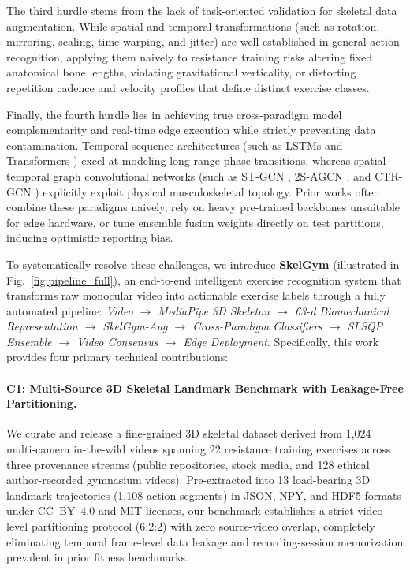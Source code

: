 \documentclass[runningheads]{llncs}
\begin{document}
The third hurdle stems from the lack of task-oriented validation for skeletal data augmentation. While spatial and temporal transformations (such as rotation, mirroring, scaling, time warping, and jitter) are well-established in general action recognition, applying them naively to resistance training risks altering fixed anatomical bone lengths, violating gravitational verticality, or distorting repetition cadence and velocity profiles that define distinct exercise classes.

Finally, the fourth hurdle lies in achieving true cross-paradigm model complementarity and real-time edge execution while strictly preventing data contamination. Temporal sequence architectures (such as LSTMs \cite{hochreiter1997long,graves2005} and Transformers \cite{vaswani2017}) excel at modeling long-range phase transitions, whereas spatial-temporal graph convolutional networks (such as ST-GCN \cite{yan2018}, 2S-AGCN \cite{shi2019two}, and CTR-GCN \cite{chen2021channel}) explicitly exploit physical musculoskeletal topology. Prior works often combine these paradigms naively, rely on heavy pre-trained backbones unsuitable for edge hardware, or tune ensemble fusion weights directly on test partitions, inducing optimistic reporting bias.

To systematically resolve these challenges, we introduce \textbf{SkelGym} (illustrated in Fig.~\ref{fig:pipeline_full}), an end-to-end intelligent exercise recognition system that transforms raw monocular video into actionable exercise labels through a fully automated pipeline: \textit{Video $\rightarrow$ MediaPipe 3D Skeleton $\rightarrow$ 63-d Biomechanical Representation $\rightarrow$ SkelGym-Aug $\rightarrow$ Cross-Paradigm Classifiers $\rightarrow$ SLSQP Ensemble $\rightarrow$ Video Consensus $\rightarrow$ Edge Deployment}. Specifically, this work provides four primary technical contributions:

\paragraph{C1: Multi-Source 3D Skeletal Landmark Benchmark with Leakage-Free Partitioning.} We curate and release a fine-grained 3D skeletal dataset derived from 1,024 multi-camera in-the-wild videos spanning 22 resistance training exercises across three provenance streams (public repositories, stock media, and 128 ethical author-recorded gymnasium videos). Pre-extracted into 13 load-bearing 3D landmark trajectories (1,108 action segments) in JSON, NPY, and HDF5 formats under CC~BY~4.0 and MIT licenses, our benchmark establishes a strict video-level partitioning protocol (6:2:2) with zero source-video overlap, completely eliminating temporal frame-level data leakage and recording-session memorization prevalent in prior fitness benchmarks.
\end{document}
